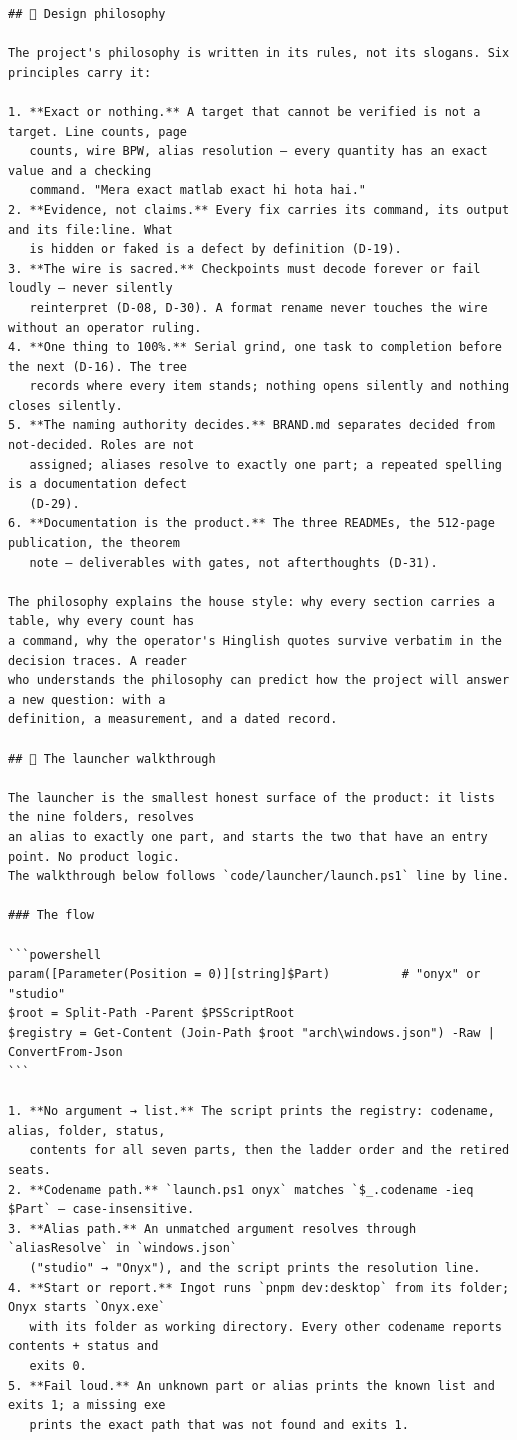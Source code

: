 \begin{Verbatim}[breaklines,breakanywhere,fontsize=\footnotesize]
## 🧠 Design philosophy

The project's philosophy is written in its rules, not its slogans. Six principles carry it:

1. **Exact or nothing.** A target that cannot be verified is not a target. Line counts, page
   counts, wire BPW, alias resolution — every quantity has an exact value and a checking
   command. "Mera exact matlab exact hi hota hai."
2. **Evidence, not claims.** Every fix carries its command, its output and its file:line. What
   is hidden or faked is a defect by definition (D-19).
3. **The wire is sacred.** Checkpoints must decode forever or fail loudly — never silently
   reinterpret (D-08, D-30). A format rename never touches the wire without an operator ruling.
4. **One thing to 100%.** Serial grind, one task to completion before the next (D-16). The tree
   records where every item stands; nothing opens silently and nothing closes silently.
5. **The naming authority decides.** BRAND.md separates decided from not-decided. Roles are not
   assigned; aliases resolve to exactly one part; a repeated spelling is a documentation defect
   (D-29).
6. **Documentation is the product.** The three READMEs, the 512-page publication, the theorem
   note — deliverables with gates, not afterthoughts (D-31).

The philosophy explains the house style: why every section carries a table, why every count has
a command, why the operator's Hinglish quotes survive verbatim in the decision traces. A reader
who understands the philosophy can predict how the project will answer a new question: with a
definition, a measurement, and a dated record.

## 🚀 The launcher walkthrough

The launcher is the smallest honest surface of the product: it lists the nine folders, resolves
an alias to exactly one part, and starts the two that have an entry point. No product logic.
The walkthrough below follows `code/launcher/launch.ps1` line by line.

### The flow

```powershell
param([Parameter(Position = 0)][string]$Part)          # "onyx" or "studio"
$root = Split-Path -Parent $PSScriptRoot
$registry = Get-Content (Join-Path $root "arch\windows.json") -Raw | ConvertFrom-Json
```

1. **No argument → list.** The script prints the registry: codename, alias, folder, status,
   contents for all seven parts, then the ladder order and the retired seats.
2. **Codename path.** `launch.ps1 onyx` matches `$_.codename -ieq $Part` — case-insensitive.
3. **Alias path.** An unmatched argument resolves through `aliasResolve` in `windows.json`
   ("studio" → "Onyx"), and the script prints the resolution line.
4. **Start or report.** Ingot runs `pnpm dev:desktop` from its folder; Onyx starts `Onyx.exe`
   with its folder as working directory. Every other codename reports contents + status and
   exits 0.
5. **Fail loud.** An unknown part or alias prints the known list and exits 1; a missing exe
   prints the exact path that was not found and exits 1.


\end{Verbatim}
